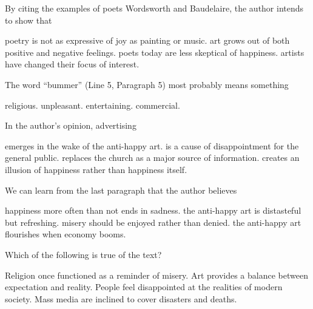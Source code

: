 \item By citing the examples of poets Wordsworth and Baudelaire, the author intends   to show that
\begin{tasks}
	\task poetry is not as expressive of joy as painting or music.
	\task art grows out of both positive and negative feelings.
	\task poets today are less skeptical of happiness.
	\task artists have changed their focus of interest.
\end{tasks}
\item The word ``bummer'' (Line 5, Paragraph 5) most probably means something
\begin{tasks}
	\task religious.
	\task unpleasant.
	\task entertaining.
	\task commercial.
\end{tasks}
\item In the author's opinion, advertising
\begin{tasks}
	\task emerges in the wake of the anti-happy art.
	\task is a cause of disappointment for the general public.
	\task replaces the church as a major source of information.
	\task creates an illusion of happiness rather than happiness itself.
\end{tasks}
\item We can learn from the last paragraph that the author believes
\begin{tasks}
	\task happiness more often than not ends in sadness.
	\task the anti-happy art is distasteful but refreshing.
	\task misery should be enjoyed rather than denied.
	\task the anti-happy art flourishes when economy booms.
\end{tasks}
\item Which of the following is true of the text?
\begin{tasks}
	\task Religion once functioned as a reminder of misery.
	\task Art provides a balance between expectation and reality.
	\task People feel disappointed at the realities of modern society.
	\task Mass media are inclined to cover disasters and deaths.
\end{tasks}